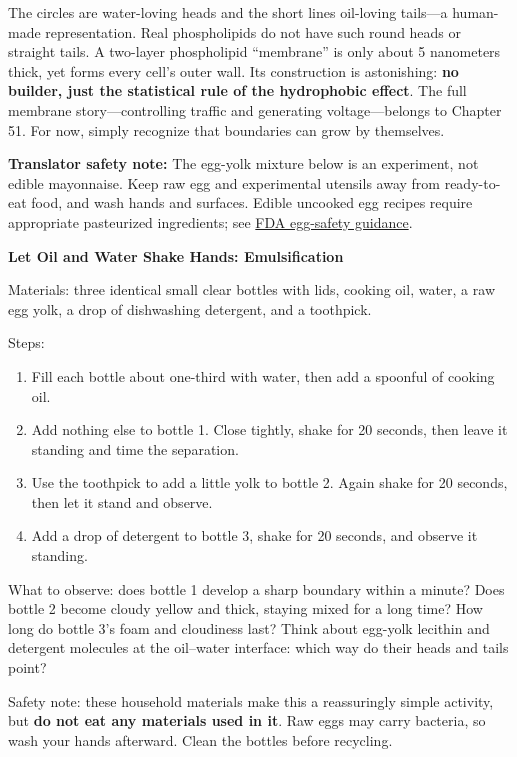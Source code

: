 The circles are water-loving heads and the short lines oil-loving tails---a human-made representation. Real phospholipids do not have such round heads or straight tails. A two-layer phospholipid ``membrane'' is only about 5 nanometers thick, yet forms every cell's outer wall. Its construction is astonishing: \textbf{no builder, just the statistical rule of the hydrophobic effect}. The full membrane story---controlling traffic and generating voltage---belongs to Chapter 51. For now, simply recognize that boundaries can grow by themselves.

\textbf{Translator safety note:} The egg-yolk mixture below is an experiment, not edible mayonnaise. Keep raw egg and experimental utensils away from ready-to-eat food, and wash hands and surfaces. Edible uncooked egg recipes require appropriate pasteurized ingredients; see \href{https://www.fda.gov/food/retail-food-industryregulatory-assistance-training/assuring-safety-eggs-and-menu-and-deli-items-made-raw-shell-eggs}{FDA egg-safety guidance}.

\begin{shiyan}
\textbf{Let Oil and Water Shake Hands: Emulsification}

Materials: three identical small clear bottles with lids, cooking oil, water, a raw egg yolk, a drop of dishwashing detergent, and a toothpick.

Steps:
\begin{enumerate}[itemsep=1pt]
\item Fill each bottle about one-third with water, then add a spoonful of cooking oil.
\item Add nothing else to bottle 1. Close tightly, shake for 20 seconds, then leave it standing and time the separation.
\item Use the toothpick to add a little yolk to bottle 2. Again shake for 20 seconds, then let it stand and observe.
\item Add a drop of detergent to bottle 3, shake for 20 seconds, and observe it standing.
\end{enumerate}

What to observe: does bottle 1 develop a sharp boundary within a minute? Does bottle 2 become cloudy yellow and thick, staying mixed for a long time? How long do bottle 3's foam and cloudiness last? Think about egg-yolk lecithin and detergent molecules at the oil--water interface: which way do their heads and tails point?

Safety note: these household materials make this a reassuringly simple activity, but \textbf{do not eat any materials used in it}. Raw eggs may carry bacteria, so wash your hands afterward. Clean the bottles before recycling.
\end{shiyan}

